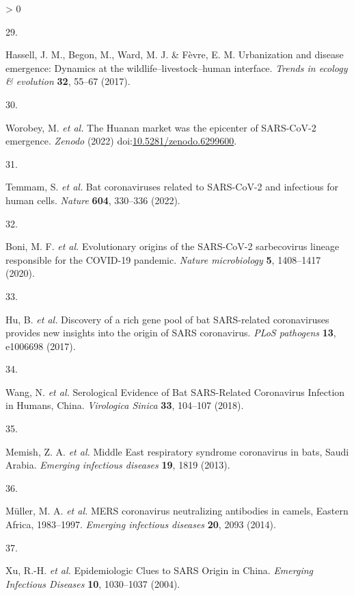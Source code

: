 \documentclass[11pt]{article}
\newlength{\cslhangindent}
\newlength{\csllabelwidth}
\newenvironment{CSLReferences}[3] %
 {%
  \setlength{\parindent}{0pt}
  \ifodd #1 \everypar{\setlength{\hangindent}{\cslhangindent}}\ignorespaces\fi
  \ifnum #2 > 0
  \setlength{\parskip}{#2\baselineskip}
  \fi
 }%
 {}
\newcommand{\CSLLeftMargin}[1]{\parbox[t]{\maxof{\widthof{#1}}{\csllabelwidth}}{#1}}
\newcommand{\CSLRightInline}[1]{\parbox[t]{\linewidth}{#1}}
\begin{document}
\begin{CSLReferences}{0}{0}
\leavevmode\hypertarget{ref-Hassell2017UrbDis}{}%
\CSLLeftMargin{29. }
\CSLRightInline{Hassell, J. M., Begon, M., Ward, M. J. \& Fèvre, E. M.
Urbanization and disease emergence: Dynamics at the
wildlife--livestock--human interface. \emph{Trends in ecology \&
evolution} \textbf{32}, 55--67 (2017).}

\leavevmode\hypertarget{ref-Worobey2022HuaMar}{}%
\CSLLeftMargin{30. }
\CSLRightInline{Worobey, M. \emph{et al.} The Huanan market was the
epicenter of SARS-CoV-2 emergence. \emph{Zenodo} (2022)
doi:\href{https://doi.org/10.5281/zenodo.6299600}{10.5281/zenodo.6299600}.}

\leavevmode\hypertarget{ref-Temmam2022BatCor}{}%
\CSLLeftMargin{31. }
\CSLRightInline{Temmam, S. \emph{et al.} Bat coronaviruses related to
SARS-CoV-2 and infectious for human cells. \emph{Nature} \textbf{604},
330--336 (2022).}

\leavevmode\hypertarget{ref-Boni2020EvoOri}{}%
\CSLLeftMargin{32. }
\CSLRightInline{Boni, M. F. \emph{et al.} Evolutionary origins of the
SARS-CoV-2 sarbecovirus lineage responsible for the COVID-19 pandemic.
\emph{Nature microbiology} \textbf{5}, 1408--1417 (2020).}

\leavevmode\hypertarget{ref-Hu2017DisRic}{}%
\CSLLeftMargin{33. }
\CSLRightInline{Hu, B. \emph{et al.} Discovery of a rich gene pool of
bat SARS-related coronaviruses provides new insights into the origin of
SARS coronavirus. \emph{PLoS pathogens} \textbf{13}, e1006698 (2017).}

\leavevmode\hypertarget{ref-Wang2018SerEvi}{}%
\CSLLeftMargin{34. }
\CSLRightInline{Wang, N. \emph{et al.} Serological Evidence of Bat
SARS-Related Coronavirus Infection in Humans, China. \emph{Virologica
Sinica} \textbf{33}, 104--107 (2018).}

\leavevmode\hypertarget{ref-Memish2013MidEas}{}%
\CSLLeftMargin{35. }
\CSLRightInline{Memish, Z. A. \emph{et al.} Middle East respiratory
syndrome coronavirus in bats, Saudi Arabia. \emph{Emerging infectious
diseases} \textbf{19}, 1819 (2013).}

\leavevmode\hypertarget{ref-Muller2014MerCor}{}%
\CSLLeftMargin{36. }
\CSLRightInline{Müller, M. A. \emph{et al.} MERS coronavirus
neutralizing antibodies in camels, Eastern Africa, 1983--1997.
\emph{Emerging infectious diseases} \textbf{20}, 2093 (2014).}

\leavevmode\hypertarget{ref-Xu2004EpiClu}{}%
\CSLLeftMargin{37. }
\CSLRightInline{Xu, R.-H. \emph{et al.} Epidemiologic Clues to SARS
Origin in China. \emph{Emerging Infectious Diseases} \textbf{10},
1030--1037 (2004).}


\end{CSLReferences}
\end{document}
